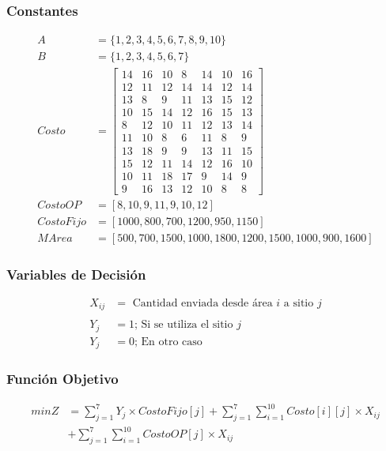 \documentclass[a4paper,12pt]{article}
\begin{document}
\subsubsection{Constantes}
\begin{equation*}
\begin{split}
A&=\{1,2,3,4,5,6,7,8,9,10\}\\
B&=\{1,2,3,4,5,6,7\}\\
Costo &= \begin{bmatrix}
14 & 16 & 10 & 8 & 14 & 10 & 16\\
12 & 11 & 12 & 14 & 14 & 12 & 14\\
13 & 8 & 9 & 11 & 13 & 15 & 12\\
10 & 15 & 14 & 12 & 16 & 15 & 13\\
8 & 12 & 10 & 11 & 12 & 13 & 14\\
11 & 10 & 8 & 6 & 11 & 8 & 9\\
13 & 18 & 9 & 9 & 13 & 11 & 15\\
15 & 12 & 11 & 14 & 12 & 16 & 10\\
10 & 11 & 18 & 17 & 9 & 14 & 9\\
9 & 16 & 13 & 12 & 10 & 8 & 8
\end{bmatrix}\\
CostoOP&=[8,10,9,11,9,10,12]\\
CostoFijo&=[1000,800,700,1200,950,1150]\\
MArea&=[500,700,1500,1000,1800,1200,1500,1000,900,1600]
\end{split}
\end{equation*}
\subsubsection{Variables de Decisión}
\begin{equation*}
\begin{split}
	X_{ij}&=\text{ Cantidad enviada desde área } i \text{ a sitio } j\\
	\\
	Y_j&=1 \text{; Si se utiliza el sitio } j\\
	Y_j&=0 \text{; En otro caso}
\end{split}
\end{equation*}
\subsubsection{Función Objetivo}
\begin{equation*}
\begin{split}
	minZ &= \sum_{j=1}^{7}Y_j\times CostoFijo[j] + \sum_{j=1}^{7}\sum_{i=1}^{10}Costo[i][j]\times X_{ij}\\ 
	&+ \sum_{j=1}^{7}\sum_{i=1}^{10}CostoOP[j]\times X_{ij}
\end{split}
\end{equation*}
\end{document}

